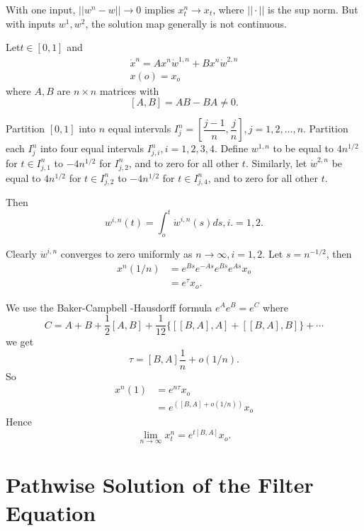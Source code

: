 With one input, $|| w^{n}-w|| \to 0$ implies $x_t ^n \to x_t$, where
$|| \cdot || $ is the sup norm. But with inputs $w^1, w^2$, the
solution map generally is not continuous.  

\begin{example}%
 Let\pageoriginale $t \in  [ 0, 1]$ and 
  \begin{gather*}
    \dot{x}^n = Ax^{n}\dot{w}^{1, n}+ Bx^n \dot{w}^{2, n}\\
    x(o)=x_o
  \end{gather*}
  where $A, B$ are $n \times n$ matrices with
  $$
  [A, B]= AB - BA \neq 0. 
  $$

  Partition $[0,1]$ into $n$ equal intervals $I^n_j =
  \left[\dfrac{j-1}{n}, \dfrac{j}{n}\right], j=1, 2, \ldots,
  n$. Partition each 
  $I_j^n$ into four equal intervals $I_{j, i}^{n}, i = 1, 2, 3,
  4$. Define $w^{1, n}$ to be equal to $4n^{1/2}$ for $t \in 
  I_{j, 1}^{n} $ to $-4n^{1/2}$ for $I_{j, 2}^n $, and to zero for all
  other $t$. Similarly, let $\dot{w}^{2, n} $ be equal to $4n^{1/2}$
  for $t \in  I_{j, 2}^n $ to $-4n^{1/2}$ for $t \in 
  I_{j, 4}^n$, and to zero for all other $t$.  
\end{example}

  Then
  $$
  w^{i, n}(t) =\int_o^t \dot{w}^{i, n}(s) ds, i. = 1, 2. 
  $$
  
  Clearly $\dot{w}^{i, n}$ converges to zero uniformly as $n
  \rightarrow \infty, i = 1, 2$. Let $s =n^{-1/2}$, then 
  \begin{align*}
    x^n (1/n)&= e^{Bs}e^{-As}e^{Bs}e^{As} x_o\\
    &= e^{ \tau}x_o. 
  \end{align*}

  We use the Baker-Campbell -Hausdorff formula $e^A e^B = e^C$ where
  $$
  C= A + B + \frac{1}{2} [A, B]+ \frac{1}{12}\{ [[B, A], A] + [[B, A],
    B]\}+ \cdots  
  $$
  we get
  $$
  \tau = [B, A] \frac{1}{n} + o(1/n). 	
  $$
  So\pageoriginale
  \begin{align*}
    x^n (1)&= e^{n \tau }x_o\\
    &=e^{([B, A]+ o(1/n))}x_o
  \end{align*}
  Hence
  $$
  \lim_{n \rightarrow \infty} x_t ^n = e^{t[B, A]}x_o. 
  $$










\section{Pathwise Solution of the Filter
  Equation}\label{part2:sec3}%
 

